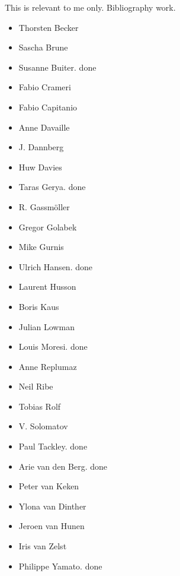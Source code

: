 
This is relevant to me only. Bibliography work.
\begin{itemize}
\item Thorsten Becker
\item Sascha Brune
\item Susanne Buiter. done
\item Fabio Crameri
\item Fabio Capitanio
\item Anne Davaille
\item J. Dannberg
\item Huw Davies
\item Taras Gerya. done
\item R. Gassm\"oller
\item Gregor Golabek
\item Mike Gurnis
\item Ulrich Hansen. done
\item Laurent Husson
\item Boris Kaus 
\item Julian Lowman
\item Louis Moresi. done
\item Anne Replumaz
\item Neil Ribe
\item Tobias Rolf
\item V. Solomatov 
\item Paul Tackley. done
\item Arie van den Berg. done
\item Peter van Keken 
\item Ylona van Dinther
\item Jeroen van Hunen
\item Iris van Zelst
\item Philippe Yamato. done
\end{itemize}
